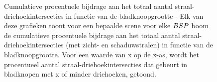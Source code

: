 \begin{figure}
  \centering
  \begin{subfigure}{0.48\linewidth}
    \centering
  \end{subfigure}
  \begin{subfigure}{0.48\linewidth}
    \centering
  \end{subfigure}
  \begin{subfigure}{0.48\linewidth}
    \centering
  \end{subfigure}
  \begin{subfigure}{0.48\linewidth}
    \centering
  \end{subfigure}
  \caption[Cumulatieve procentuele bijdrage aan het totaal aantal straal-driehoekintersecties in functie van de bladknoopgrootte]{Cumulatieve procentuele bijdrage aan het totaal aantal straal-driehoekintersecties in functie van de bladknoopgrootte - \small Elk van deze grafieken toont voor een bepaalde scene voor elke $BSP$ boom de cumulatieve procentuele bijdrage aan het totaal aantal straal-driehoekintersecties (met zicht- en schaduwstralen) in functie van de bladknoopgrootte. Voor een waarde van x op de x-as, wordt het procentueel aantal straal-driehoekintersecties dat gebeurt in bladknopen met x of minder driehoeken, getoond.}
  \label{fig:vergelijking-blad}
\end{figure}


